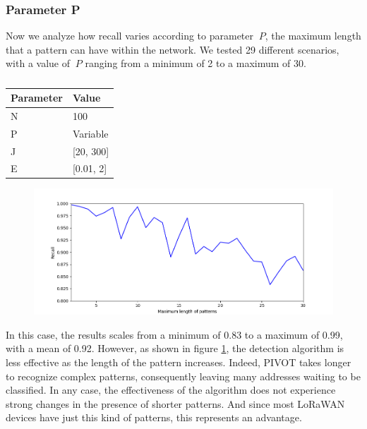 \vspace{3mm}

\subsubsection{Parameter P}
Now we analyze how recall varies according to parameter \(\ P \), the maximum length that a pattern can have within the network. We tested 29 different scenarios, with a value of \(\ P \) ranging from a minimum of 2 to a maximum of 30.

\vspace{3mm}
\begin{table}[H]
\centering
\caption{}
\label{tab:parameter_P}
\begin{tabular}{|l|l|}
\hline
\multicolumn{1}{|c|}{\textbf{Parameter}} & \textbf{Value} \\ \hline
N                                        & 100            \\ \hline
P                                        & Variable              \\ \hline
J                                     & [20, 300]             \\ \hline
E                                     & [0.01, 2]           \\ \hline
\end{tabular}
\end{table}
\vspace{3mm}

\vspace{3mm}
\begin{figure}[H]
    \centering
    \includegraphics[width=1\linewidth]{images/implementation/P.png}
    \caption{}
    \label{fig:testp}
\end{figure}
\vspace{3mm}

In this case, the results scales from a minimum of 0.83 to a maximum of 0.99, with a mean of 0.92. However, as shown in figure \ref{fig:testp}, the detection algorithm is less effective as the length of the pattern increases. Indeed, PIVOT takes longer to recognize complex patterns, consequently leaving many addresses waiting to be classified. In any case, the effectiveness of the algorithm does not experience strong changes in the presence of shorter patterns. And since most LoRaWAN devices have just this kind of patterns, this represents an advantage.

